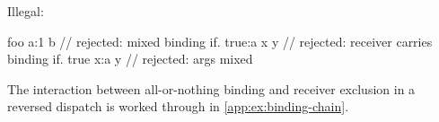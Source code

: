 Illegal:
\begin{ffcode}
foo a:1 b                  // rejected: mixed binding
if. true:a x y             // rejected: receiver carries binding
if. true x:a y             // rejected: args mixed
\end{ffcode}

The interaction between all-or-nothing binding and receiver
  exclusion in a reversed dispatch is worked through in
  \cref{app:ex:binding-chain}.
